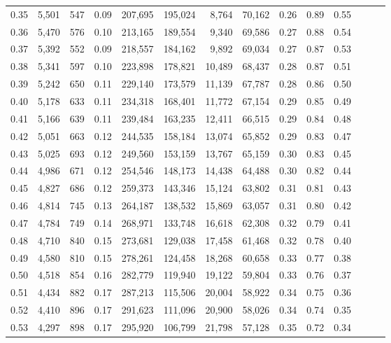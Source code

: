 \begin{tabular}{rrrrrrrrrrrrrr}
0.35 &  5,501 &    547 &  0.09 &  207,695 &  195,024 &   8,764 &  70,162 &  0.26 &  0.89 &      0.55 \\
0.36 &  5,470 &    576 &  0.10 &  213,165 &  189,554 &   9,340 &  69,586 &  0.27 &  0.88 &      0.54 \\
0.37 &  5,392 &    552 &  0.09 &  218,557 &  184,162 &   9,892 &  69,034 &  0.27 &  0.87 &      0.53 \\
0.38 &  5,341 &    597 &  0.10 &  223,898 &  178,821 &  10,489 &  68,437 &  0.28 &  0.87 &      0.51 \\
0.39 &  5,242 &    650 &  0.11 &  229,140 &  173,579 &  11,139 &  67,787 &  0.28 &  0.86 &      0.50 \\
0.40 &  5,178 &    633 &  0.11 &  234,318 &  168,401 &  11,772 &  67,154 &  0.29 &  0.85 &      0.49 \\
0.41 &  5,166 &    639 &  0.11 &  239,484 &  163,235 &  12,411 &  66,515 &  0.29 &  0.84 &      0.48 \\
0.42 &  5,051 &    663 &  0.12 &  244,535 &  158,184 &  13,074 &  65,852 &  0.29 &  0.83 &      0.47 \\
0.43 &  5,025 &    693 &  0.12 &  249,560 &  153,159 &  13,767 &  65,159 &  0.30 &  0.83 &      0.45 \\
0.44 &  4,986 &    671 &  0.12 &  254,546 &  148,173 &  14,438 &  64,488 &  0.30 &  0.82 &      0.44 \\
0.45 &  4,827 &    686 &  0.12 &  259,373 &  143,346 &  15,124 &  63,802 &  0.31 &  0.81 &      0.43 \\
0.46 &  4,814 &    745 &  0.13 &  264,187 &  138,532 &  15,869 &  63,057 &  0.31 &  0.80 &      0.42 \\
0.47 &  4,784 &    749 &  0.14 &  268,971 &  133,748 &  16,618 &  62,308 &  0.32 &  0.79 &      0.41 \\
0.48 &  4,710 &    840 &  0.15 &  273,681 &  129,038 &  17,458 &  61,468 &  0.32 &  0.78 &      0.40 \\
0.49 &  4,580 &    810 &  0.15 &  278,261 &  124,458 &  18,268 &  60,658 &  0.33 &  0.77 &      0.38 \\
0.50 &  4,518 &    854 &  0.16 &  282,779 &  119,940 &  19,122 &  59,804 &  0.33 &  0.76 &      0.37 \\
0.51 &  4,434 &    882 &  0.17 &  287,213 &  115,506 &  20,004 &  58,922 &  0.34 &  0.75 &      0.36 \\
0.52 &  4,410 &    896 &  0.17 &  291,623 &  111,096 &  20,900 &  58,026 &  0.34 &  0.74 &      0.35 \\
0.53 &  4,297 &    898 &  0.17 &  295,920 &  106,799 &  21,798 &  57,128 &  0.35 &  0.72 &      0.34 \\

\end{tabular}
